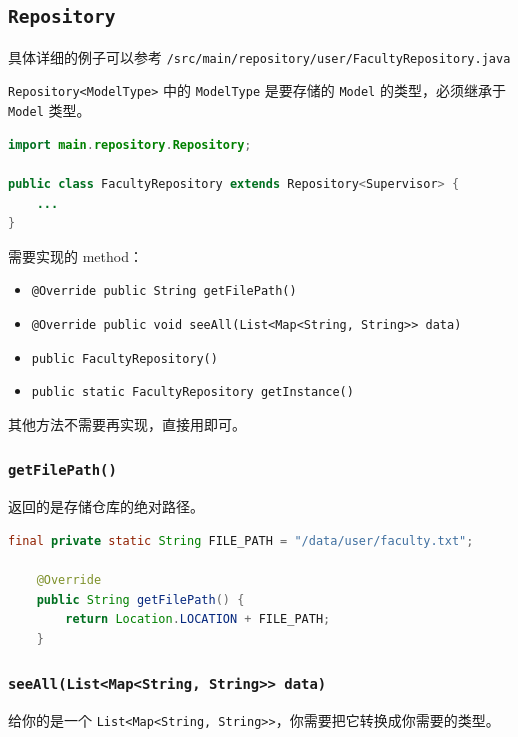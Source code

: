 \documentclass[hyperref,UTF8,12pt,a4paper]{ctexart}
\begin{document}
\subsection{\texttt{Repository}}

具体详细的例子可以参考 \texttt{/src/main/repository/user/FacultyRepository.java}

\texttt{Repository<ModelType>} 中的 \texttt{ModelType} 是要存储的 \texttt{Model} 的类型，必须继承于 \texttt{Model} 类型。

\begin{lstlisting}[language=Java]
import main.repository.Repository;

public class FacultyRepository extends Repository<Supervisor> {
	...
}
\end{lstlisting}

需要实现的 method：

\begin{itemize}
	\item \texttt{@Override public String getFilePath()}
	\item \texttt{@Override public void seeAll(List<Map<String, String>> data)}
	\item \texttt{public FacultyRepository()}
	\item \texttt{public static FacultyRepository getInstance()}
\end{itemize}

其他方法不需要再实现，直接用即可。

\subsubsection{\texttt{getFilePath()}}

返回的是存储仓库的绝对路径。

\begin{lstlisting}[language=Java]
    final private static String FILE_PATH = "/data/user/faculty.txt";

    @Override
    public String getFilePath() {
        return Location.LOCATION + FILE_PATH;
    }
\end{lstlisting}

\subsubsection{\texttt{seeAll(List<Map<String, String>> data)}}

给你的是一个 \texttt{List<Map<String, String>>}，你需要把它转换成你需要的类型。
\end{document}
